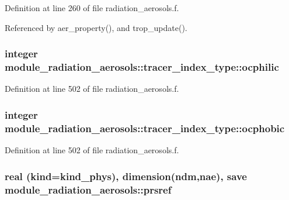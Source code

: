 Definition at line 260 of file radiation\+\_\+aerosols.\+f.



Referenced by aer\+\_\+property(), and trop\+\_\+update().

\subsubsection[{\texorpdfstring{ocphilic}{ocphilic}}]{\setlength{\rightskip}{0pt plus 5cm}integer module\+\_\+radiation\+\_\+aerosols\+::tracer\+\_\+index\+\_\+type\+::ocphilic\hspace{0.3cm}{\ttfamily [private]}}\hypertarget{group__module__radiation__aerosols_ga95e99f68fc7344f78f2ee316bc447651}{}\label{group__module__radiation__aerosols_ga95e99f68fc7344f78f2ee316bc447651}


Definition at line 502 of file radiation\+\_\+aerosols.\+f.

\subsubsection[{\texorpdfstring{ocphobic}{ocphobic}}]{\setlength{\rightskip}{0pt plus 5cm}integer module\+\_\+radiation\+\_\+aerosols\+::tracer\+\_\+index\+\_\+type\+::ocphobic\hspace{0.3cm}{\ttfamily [private]}}\hypertarget{group__module__radiation__aerosols_ga3ace1c1bbade423efd216e676511c470}{}\label{group__module__radiation__aerosols_ga3ace1c1bbade423efd216e676511c470}


Definition at line 502 of file radiation\+\_\+aerosols.\+f.

\subsubsection[{\texorpdfstring{prsref}{prsref}}]{\setlength{\rightskip}{0pt plus 5cm}real (kind=kind\+\_\+phys), dimension(ndm,nae), save module\+\_\+radiation\+\_\+aerosols\+::prsref\hspace{0.3cm}{\ttfamily [private]}}\hypertarget{group__module__radiation__aerosols_ga274fad1b6e00e66375882e32494d61c0}{}\label{group__module__radiation__aerosols_ga274fad1b6e00e66375882e32494d61c0}



